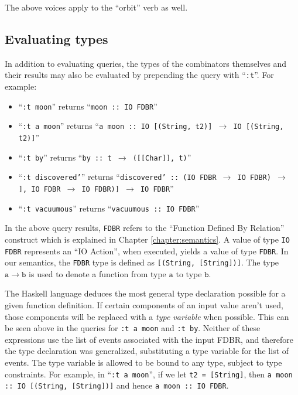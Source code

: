 \documentclass[../main.tex]{subfiles}
\begin{document}
The above voices apply to the ``orbit'' verb as well.

\subsection{Evaluating types}

In addition to evaluating queries, the types of the combinators themselves and their results may also be evaluated by prepending the query with
``\texttt{:t}''.  For example:

\begin{itemize}
	\item ``\texttt{:t moon}'' returns ``\texttt{moon :: IO FDBR}''
	\item ``\texttt{:t a moon}'' \subitem returns ``\texttt{a moon :: IO [(String,  t2)] $\rightarrow$ IO [(String,  t2)]}''
	\item ``\texttt{:t by}'' returns ``\texttt{by :: t $\rightarrow$ ([[Char]],  t)}''
	\item ``\texttt{:t discovered'}'' \subitem returns ``\texttt{discovered' :: (IO FDBR $\rightarrow$ IO FDBR) $\rightarrow$ \subsubitem [([[Char]],  IO FDBR $\rightarrow$ IO FDBR)] $\rightarrow$ IO FDBR}''
	\item ``\texttt{:t vacuumous}'' returns ``\texttt{vacuumous :: IO FDBR}''
\end{itemize}

In the above query results, \texttt{FDBR} refers to the ``Function Defined By Relation'' construct which is explained in Chapter \ref{chapter:semantics}.  A value of type
\texttt{IO FDBR} represents an ``IO Action'', when executed, yields a value of type \texttt{FDBR}.  In our semantics, the \texttt{FDBR} type is defined as \texttt{[(String, [String])]}.
The type $\mathtt{a \rightarrow b}$ is used to denote a function from type $\mathtt{a}$ to type $\mathtt{b}$.

The Haskell language deduces the most general type declaration possible for a given function definition.  If certain components of an input value aren't used,
those components will be replaced with a {\em type variable} when possible.  This can be seen above in the queries for \texttt{:t a moon} and \texttt{:t by}.
Neither of these expressions use the list of events associated with the input FDBR, and therefore the type declaration was generalized,
substituting a type variable for the list of events.  The type variable is allowed to be bound to any type, subject to type constraints.
For example, in ``\texttt{:t a moon}'', if we let \texttt{t2 = [String]}, then \texttt{a moon :: IO [(String, [String])]} and hence \texttt {a moon :: IO FDBR}.
\end{document}
